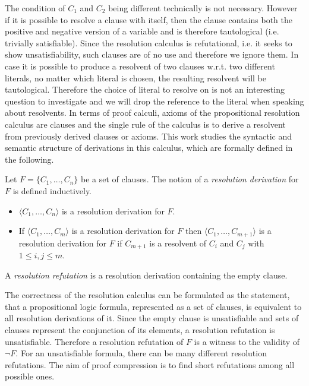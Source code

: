 The condition of $C_1$ and $C_2$ being different technically is not necessary.
However if it is possible to resolve a clause with itself, then the clause contains both the positive and negative version of a variable and is therefore tautological (i.e. trivially satisfiable).
Since the resolution calculus is refutational, i.e. it seeks to show unsatisfiability, such clauses are of no use and therefore we ignore them.
In case it is possible to produce a resolvent of two clauses w.r.t. two different literals, no matter which literal is chosen, the resulting resolvent will be tautological.
Therefore the choice of literal to resolve on is not an interesting question to investigate and we will drop the reference to the literal when speaking about resolvents.
In terms of proof calculi, axioms of the propositional resolution calculus are clauses and the single rule of the calculus is to derive a resolvent from previously derived clauses or axioms.
This work studies the syntactic and semantic structure of derivations in this calculus, which are formally defined in the following.

\begin{definition}

Let $F = \{C_1, \ldots, C_n\}$ be a set of clauses.
The notion of a \emph{resolution derivation} for $F$ is defined inductively.
\begin{itemize}
	\item $\langle C_1, \ldots, C_n\rangle$ is a resolution derivation for $F$.
	\item If $\langle C_1, \ldots, C_m\rangle$ is a resolution derivation for $F$ then $\langle C_1, \ldots, C_{m+1} \rangle$ is a resolution derivation for $F$ if $C_{m+1}$ is a resolvent of $C_i$ and $C_j$ with $1 \leq i,j \leq m$.
\end{itemize}
A \emph{resolution refutation} is a resolution derivation containing the empty clause.

\end{definition}

The correctness of the resolution calculus can be formulated as the statement, that a propositional logic formula, represented as a set of clauses, is equivalent to all resolution derivations of it. 
Since the empty clause is unsatisfiable and sets of clauses represent the conjunction of its elements, a resolution refutation is unsatisfiable.
Therefore a resolution refutation of $F$ is a witness to the validity of $\neg F$.
For an unsatisfiable formula, there can be many different resolution refutations.
The aim of proof compression is to find short refutations among all possible ones.

